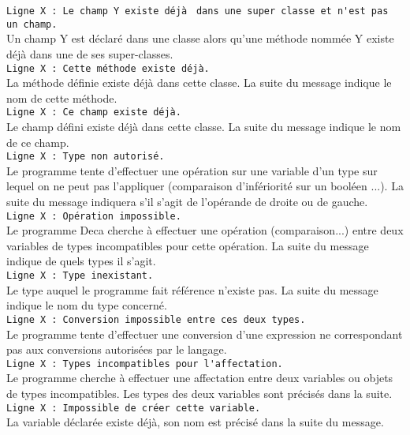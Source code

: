 \documentclass[12pt]{article}
\begin{document}
\lstinline!Ligne X : Le champ Y existe déjà !
\lstinline!dans une super classe et n'est pas un champ.!\\
Un champ Y est déclaré dans une classe alors qu'une méthode nommée Y existe
déjà dans une de ses super-classes.\\

\lstinline!Ligne X : Cette méthode existe déjà.!\\
La méthode définie existe déjà dans cette classe.
La suite du message indique le nom de cette méthode.\\

\lstinline!Ligne X : Ce champ existe déjà.!\\
Le champ défini existe déjà dans cette classe.
La suite du message indique le nom de ce champ.\\

\lstinline!Ligne X : Type non autorisé.!\\
Le programme tente d'effectuer une opération sur une variable d'un
type sur lequel on ne peut pas l'appliquer (comparaison d'infériorité sur un booléen ...).
La suite du message indiquera s'il s'agit de l'opérande de droite ou de gauche.\\

\lstinline!Ligne X : Opération impossible.!\\
Le programme Deca cherche à effectuer une opération (comparaison...)
entre deux variables de types incompatibles pour cette opération.
La suite du message indique de quels types il
s'agit.\\

\lstinline!Ligne X : Type inexistant.!\\
Le type auquel le programme fait référence n'existe pas. La suite du message indique le nom
du type concerné.\\

\lstinline!Ligne X : Conversion impossible entre ces deux types.!\\
Le programme tente d'effectuer une conversion d'une expression ne correspondant pas aux conversions autorisées par le langage.\\

\lstinline!Ligne X : Types incompatibles pour l'affectation.!\\
Le programme cherche à effectuer une affectation entre deux variables ou objets de types incompatibles.
 Les types des deux variables sont précisés dans la suite.\\

\lstinline!Ligne X : Impossible de créer cette variable.!\\
La variable déclarée existe déjà, son nom est précisé dans la suite du message.\\
\end{document}
